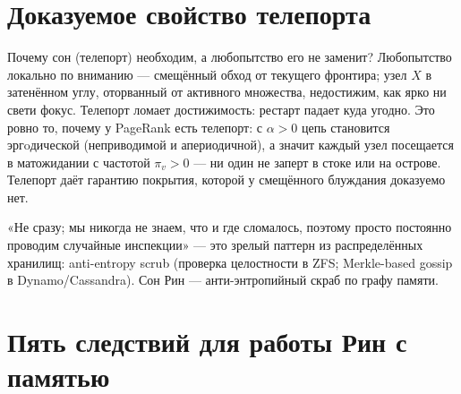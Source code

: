 \section{Доказуемое свойство телепорта}

Почему сон (телепорт) необходим, а любопытство его не заменит? Любопытство
локально по вниманию --- смещённый обход от текущего фронтира; узел $X$ в
затенённом углу, оторванный от активного множества, недостижим, как ярко ни
свети фокус. Телепорт ломает достижимость: рестарт падает куда угодно. Это
ровно то, почему у PageRank есть телепорт: с $\alpha > 0$ цепь становится
эргoдической (неприводимой и апериодичной), а значит каждый узел посещается в
матожидании с частотой $\pi_v > 0$ --- ни один не заперт в стоке или на
острове. Телепорт даёт гарантию покрытия, которой у смещённого блуждания
доказуемо нет.

\begin{intuition}
«Не сразу; мы никогда не знаем, что и где сломалось, поэтому просто постоянно
проводим случайные инспекции» --- это зрелый паттерн из распределённых
хранилищ: anti-entropy scrub (проверка целостности в ZFS; Merkle-based gossip в
Dynamo/Cassandra). Сон Рин --- анти-энтропийный скраб по графу памяти.
\end{intuition}

\section{Пять следствий для работы Рин с памятью}

